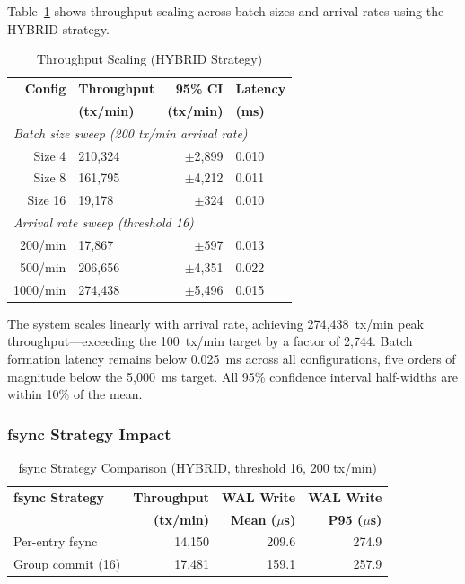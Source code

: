 Table~\ref{tab:scaling} shows throughput scaling across batch sizes and arrival
rates using the HYBRID strategy.

\begin{table}[ht]
\centering
\caption{Throughput Scaling (HYBRID Strategy)}
\label{tab:scaling}
\begin{tabular}{rlrl}
\toprule
\textbf{Config} & \textbf{Throughput} & \textbf{95\% CI} & \textbf{Latency} \\
                 & \textbf{(tx/min)}   & \textbf{(tx/min)} & \textbf{(ms)} \\
\midrule
\multicolumn{4}{l}{\emph{Batch size sweep (200 tx/min arrival rate)}} \\
Size 4   & 210,324 & $\pm$2,899 & 0.010 \\
Size 8   & 161,795 & $\pm$4,212 & 0.011 \\
Size 16  & 19,178  & $\pm$324   & 0.010 \\
\midrule
\multicolumn{4}{l}{\emph{Arrival rate sweep (threshold 16)}} \\
200/min  & 17,867  & $\pm$597   & 0.013 \\
500/min  & 206,656 & $\pm$4,351 & 0.022 \\
1000/min & 274,438 & $\pm$5,496 & 0.015 \\
\bottomrule
\end{tabular}
\end{table}

The system scales linearly with arrival rate, achieving 274,438~tx/min peak
throughput---exceeding the 100~tx/min target by a factor of 2,744. Batch
formation latency remains below 0.025~ms across all configurations, five
orders of magnitude below the 5,000~ms target. All 95\% confidence interval
half-widths are within 10\% of the mean.

\subsubsection{fsync Strategy Impact}

\begin{table}[ht]
\centering
\caption{fsync Strategy Comparison (HYBRID, threshold 16, 200 tx/min)}
\label{tab:fsync}
\begin{tabular}{lrrr}
\toprule
\textbf{fsync Strategy} & \textbf{Throughput} & \textbf{WAL Write} & \textbf{WAL Write} \\
                        & \textbf{(tx/min)}   & \textbf{Mean ($\mu$s)} & \textbf{P95 ($\mu$s)} \\
\midrule
Per-entry fsync  & 14,150  & 209.6 & 274.9 \\
Group commit (16)& 17,481  & 159.1 & 257.9 \\
\bottomrule
\end{tabular}
\end{table}

